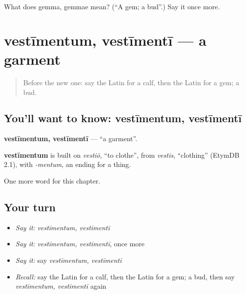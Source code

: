 \begin{tcolorbox}[breakable,colback=teal!4,colframe=teal!35!black,title={Before you move on}]
What does gemma, gemmae mean? (\textquotedblleft{}A gem; a bud\textquotedblright{}.) Say it once more.
\end{tcolorbox}
\section[vestīmentum, vestīmentī]{vestīmentum, vestīmentī — a garment}

\label{lesson:LA-C225-vestimentum}



\begin{quote}
Before the new one: say the Latin for a calf, then the Latin for a gem; a bud.
\end{quote}

\subsection*{You'll want to know: vestīmentum, vestīmentī}
\textbf{vestīmentum, vestīmentī} — \textquotedblleft{}a garment\textquotedblright{}.

\begin{cousinweb}
\textbf{vestīmentum} is built on \emph{vestiō}, \textquotedblleft{}to clothe\textquotedblright{}, from \emph{vestis}, \textquotedblleft{}clothing\textquotedblright{} (EtymDB 2.1), with \emph{-mentum}, an ending for a thing.
\end{cousinweb}

\begin{grammarlens}[title={What you've built}]
One more word for this chapter.
\end{grammarlens}

\subsection*{Your turn}
\begin{itemize}
\raggedright
  \item \emph{Say it:} \emph{vestīmentum, vestīmentī}
  \item \emph{Say it:} \emph{vestīmentum, vestīmentī}, once more
  \item \emph{Say it:} say \emph{vestīmentum, vestīmentī}
  \item \emph{Recall:} say the Latin for a calf, then the Latin for a gem; a bud, then say \emph{vestīmentum, vestīmentī} again
\end{itemize}

